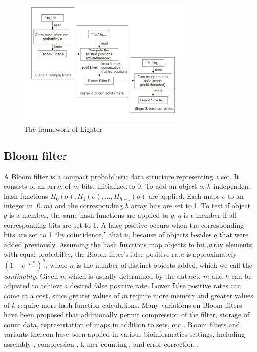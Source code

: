 \documentclass[10pt]{article}
\begin{document}
\begin{figure}[h!]
\begin{center}
\includegraphics[width=0.75\textwidth]{lighter_framework.jpg}
\caption{The framework of Lighter\label{fig:lighter_framework}}
\end{center}
\end{figure}

\subsection*{Bloom filter}
A Bloom filter \cite{bloom1970space} is a compact probabilistic data structure representing a set.  It consists of an array of $m$ bits, initialized to 0.  To add an object $o$, $h$ independent hash functions $H_0(o), H_1(o),...,H_{h-1}(o)$ are applied.  Each maps $o$ to an integer in $[0, m)$ and the corresponding $h$ array bits are set to 1. To test if object $q$ is a member, the same hash functions are applied to $q$.  $q$ is a member if all corresponding bits are set to 1.  A false positive occurs when the corresponding bits are set to 1 ``by coincidence,'' that is, because of objects besides $q$ that were added previously.  Assuming the hash functions map objects to bit array elements with equal probability, the Bloom filter's false positive rate is approximately $(1-e^{-h\frac{n}{m}})^h$, where $n$ is the number of distinct objects added, which we call the \emph{cardinality}.  Given $n$, which is usually determined by the dataset, $m$ and $h$ can be adjusted to achieve a desired false positive rate.  Lower false positive rates can come at a cost, since greater values of $m$ require more memory and greater values of $k$ require more hash function calculations.  Many variations on Bloom filters have been proposed that additionally permit compression of the filter, storage of count data, representation of maps in addition to sets, etc \cite{tarkoma2012theory}.  Bloom filters and variants thereon have been applied in various bioinformatics settings, including assembly \cite{pell2012scaling}, compression \cite{jones2012compression}, k-mer counting \cite{melsted2011efficient}, and error correction \cite{shi2010parallel}.
\end{document}
